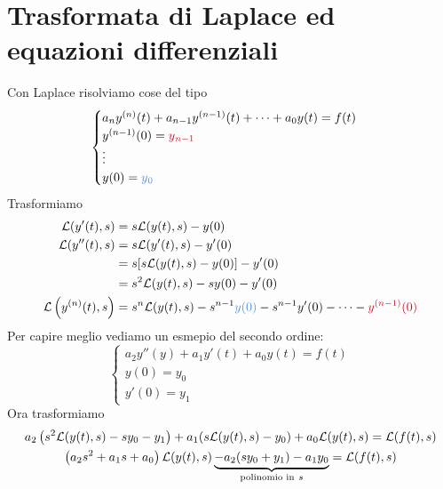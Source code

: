 \section{Trasformata di Laplace ed equazioni differenziali}

Con Laplace risolviamo cose del tipo
\begin{equation*}
\begin{cases}
a_{n} y^{(n)}(t) + a_{n - 1} y^{(n - 1)}(t) + \cdots + a_{0} y(t) = f(t)\\
y^{(n - 1)}(0) = \textcolor[rgb]{0.82, 0.01, 0.11}{y}\textcolor[rgb]{0.82, 0.01, 0.11}{_{n - 1}}\\
\vdots \\
y(0) = \textcolor[rgb]{0.29, 0.56, 0.89}{y}\textcolor[rgb]{0.29, 0.56, 0.89}{_{0}}
\end{cases}
\end{equation*}
Trasformiamo
\begin{align*}
\Lc(y'(t), s) & = s\Lc(y(t), s) - y(0)\\
\Lc(y''(t), s) & = s\Lc(y'(t), s) - y'(0)\\
 & = s[s\Lc(y(t), s) - y(0)] - y'(0)\\
 & = s^{2}\Lc(y(t), s) - sy(0) - y'(0)\\
\Lc\left(y^{(n)}(t), s\right) & = s^{n}\Lc(y(t), s) - s^{n - 1}\textcolor[rgb]{0.29, 0.56, 0.89}{y}\textcolor[rgb]{0.29, 0.56, 0.89}{(}\textcolor[rgb]{0.29, 0.56, 0.89}{0}\textcolor[rgb]{0.29, 0.56, 0.89}{)} - s^{n - 1} y'(0) - \cdots - \textcolor[rgb]{0.82, 0.01, 0.11}{y}\textcolor[rgb]{0.82, 0.01, 0.11}{^{(n - 1)}}\textcolor[rgb]{0.82, 0.01, 0.11}{(}\textcolor[rgb]{0.82, 0.01, 0.11}{0}\textcolor[rgb]{0.82, 0.01, 0.11}{)}
\end{align*}
Per capire meglio vediamo un esmepio del secondo ordine:
\begin{equation*}
\begin{cases}
a_{2} y''(y) + a_{1} y'(t) + a_{0} y(t) = f(t)\\
y(0) = y_{0}\\
y'(0) = y_{1}
\end{cases}
\end{equation*}
Ora trasformiamo
\begin{gather*}
a_{2}\left(s^{2}\mathcal{L}(y(t), s) - sy_{0} - y_{1}\right) + a_{1}(s\mathcal{L}(y(t), s) - y_{0}) + a_{0}\mathcal{L}(y(t), s) = \mathcal{L}(f(t), s)\\
\left(a_{2} s^{2} + a_{1} s + a_{0}\right)\mathcal{L}(y(t), s)\underbrace{- a_{2}(sy_{0} + y_{1}) - a_{1} y_{0}}_{\text{polinomio in} \ s}  = \mathcal{L}(f(t), s)
\end{gather*}
